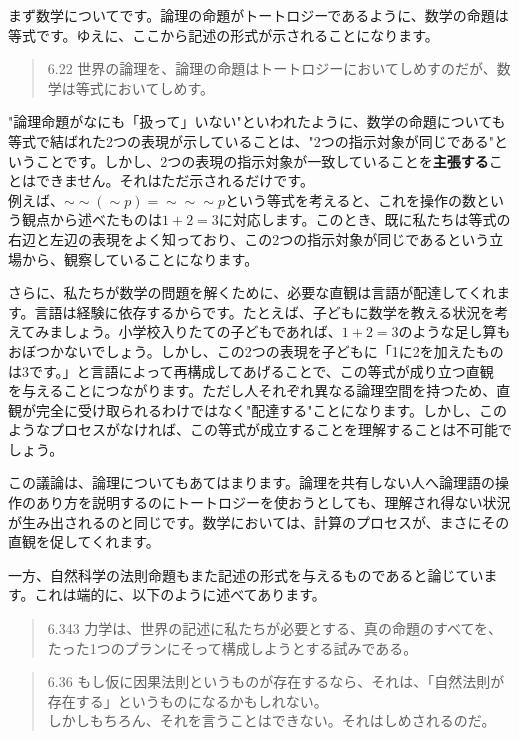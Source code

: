 \documentclass[12pt]{jsarticle}
\begin{document}
\par
まず数学についてです。論理の命題がトートロジーであるように、数学の命題は等式です。ゆえに、ここから記述の形式が示されることになります。
\begin{quote}
6.22 世界の論理を、論理の命題はトートロジーにおいてしめすのだが、数学は等式においてしめす。
\end{quote}
\par
"論理命題がなにも「扱って」いない"といわれたように、数学の命題についても等式で結ばれた2つの表現が示していることは、"2つの指示対象が同じである"ということです。しかし、2つの表現の指示対象が一致していることを\textbf{主張する}ことはできません。それはただ示されるだけです。\\
例えば、$\sim\sim(\sim p)=\sim\sim\sim p$という等式を考えると、これを操作の数という観点から述べたものは$1+2=3$に対応します。このとき、既に私たちは等式の右辺と左辺の表現をよく知っており、この2つの指示対象が同じであるという立場から、観察していることになります。
\par
さらに、私たちが数学の問題を解くために、必要な直観は言語が配達してくれます。言語は経験に依存するからです。たとえば、子どもに数学を教える状況を考えてみましょう。小学校入りたての子どもであれば、$1+2=3$のような足し算もおぼつかないでしょう。しかし、この2つの表現を子どもに「1に2を加えたものは3です。」と言語によって再構成してあげることで、この等式が成り立つ直観
を与えることにつながります。ただし人それぞれ異なる論理空間を持つため、直観が完全に受け取られるわけではなく"配達する"ことになります。しかし、このようなプロセスがなければ、この等式が成立することを理解することは不可能でしょう。\par
この議論は、論理についてもあてはまります。論理を共有しない人へ論理語の操作のあり方を説明するのにトートロジーを使おうとしても、理解され得ない状況が生み出されるのと同じです。数学においては、計算のプロセスが、まさにその直観を促してくれます。
\par
一方、自然科学の法則命題もまた記述の形式を与えるものであると論じています。これは端的に、以下のように述べてあります。

\begin{quote}
6.343 力学は、世界の記述に私たちが必要とする、真の命題のすべてを、たった1つのプランにそって構成しようとする試みである。
\end{quote}
\begin{quote}
6.36 もし仮に因果法則というものが存在するなら、それは、「自然法則が存在する」というものになるかもしれない。\\
しかしもちろん、それを言うことはできない。それはしめされるのだ。
\end{quote}
\end{document}
